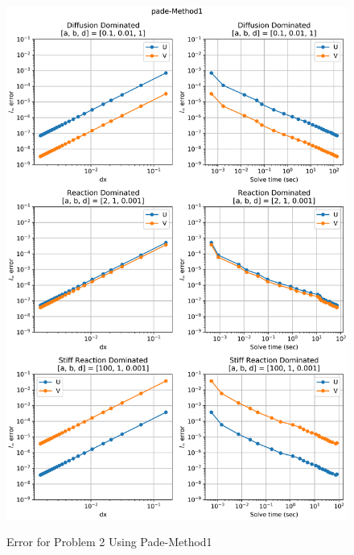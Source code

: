 \begin{figure}[t]
  \centering
  \includegraphics[width=5.75in]{images/pade-Method1problem2.png}\\
  \caption{Error for Problem 2 Using Pade-Method1}
  \label{fig:errorProblem2padeM1}
\end{figure} 

